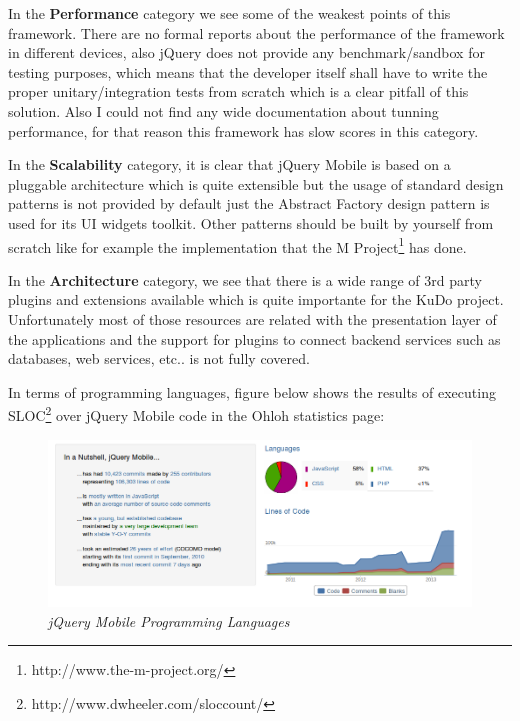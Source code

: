 \documentclass[a4paper,12pt]{book}
\begin{document}
In the \textbf{Performance} category we see some of the weakest points of this framework. There are no formal reports about the performance of the framework in different devices, also jQuery does not provide any benchmark/sandbox for testing purposes, which means that the developer itself shall have to write the proper unitary/integration tests from scratch which is a clear pitfall of this solution. Also I could not find any wide documentation about tunning performance, for that reason this framework has slow scores in this category.

In the \textbf{Scalability} category, it is clear that jQuery Mobile is based on a pluggable architecture which is quite extensible but the usage of standard design patterns is not provided by default just the Abstract Factory design pattern is used for its UI widgets toolkit. Other patterns should be built by yourself from scratch like for example the implementation that the M Project\footnote{http://www.the-m-project.org/}  has done.

In the \textbf{Architecture} category, we see that there is a wide range of 3rd party plugins and extensions\cite{jQuery Mobile resources} available which is quite importante for the KuDo project. Unfortunately most of those resources are related with the presentation layer of the applications and the support for plugins to connect backend services such as databases, web services, etc.. is not fully covered. 

In terms of programming languages, figure below shows the results of executing SLOC\footnote{http://www.dwheeler.com/sloccount/} over jQuery Mobile code in the Ohloh statistics page:

\begin{figure}[H]
    \centering
    \includegraphics[width=15cm, keepaspectratio]{img/jquerylanguages.png}
    \caption{\textit{jQuery Mobile Programming Languages}}
    \label{figure:jquerylanguages}
 \end{figure}
\end{document}
